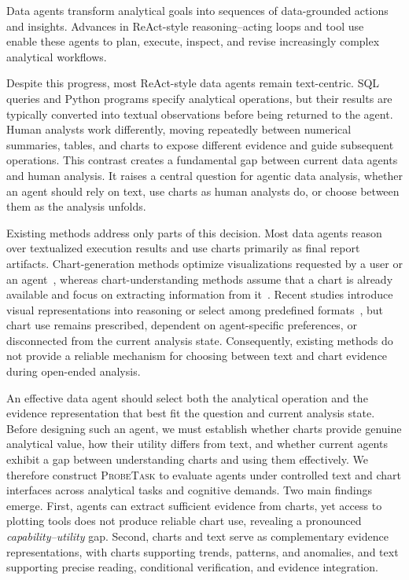 \documentclass{article}
\newcommand{\probe}{\textsc{ProbeTask}}
\begin{document}
Data agents transform analytical goals into sequences of data-grounded actions and insights.
Advances in ReAct-style reasoning--acting loops and tool use~\citep{yao2023react} enable these agents to plan, execute, inspect, and revise increasingly complex analytical workflows.

Despite this progress, most ReAct-style data agents remain text-centric.
SQL queries and Python programs specify analytical operations, but their results are typically converted into textual observations before being returned to the agent.
Human analysts work differently, moving repeatedly between numerical summaries, tables, and charts to expose different evidence and guide subsequent operations.
This contrast creates a fundamental gap between current data agents and human analysis.
It raises a central question for agentic data analysis, whether an agent should rely on text, use charts as human analysts do, or choose between them as the analysis unfolds.

Existing methods address only parts of this decision.
Most data agents reason over textualized execution results and use charts primarily as final report artifacts.
Chart-generation methods optimize visualizations requested by a user or an agent~\citep{dibia2023lida,yang2024matplotagent,yang2025chartmimic,namgoong2025amace,lu2026multivisagent,wang2025chartoptimiser}, whereas chart-understanding methods assume that a chart is already available and focus on extracting information from it~\citep{masry2023unichart,han2023chartllama,xu2023chartbench,liu2023deplot,liu2023matcha,zhang2024tinychart}.
Recent studies introduce visual representations into reasoning or select among predefined formats~\citep{kaur2026chartagent,das2025chartsofthought,zhou2025fres,ho2026formatmatters,xing2026tabledart,lin2026evidfuse}, but chart use remains prescribed, dependent on agent-specific preferences, or disconnected from the current analysis state.
Consequently, existing methods do not provide a reliable mechanism for choosing between text and chart evidence during open-ended analysis.

An effective data agent should select both the analytical operation and the evidence representation that best fit the question and current analysis state.
Before designing such an agent, we must establish whether charts provide genuine analytical value, how their utility differs from text, and whether current agents exhibit a gap between understanding charts and using them effectively.
We therefore construct \probe{} to evaluate agents under controlled text and chart interfaces across analytical tasks and cognitive demands.
Two main findings emerge.
First, agents can extract sufficient evidence from charts, yet access to plotting tools does not produce reliable chart use, revealing a pronounced \emph{capability--utility} gap.
Second, charts and text serve as complementary evidence representations, with charts supporting trends, patterns, and anomalies, and text supporting precise reading, conditional verification, and evidence integration.
\end{document}
